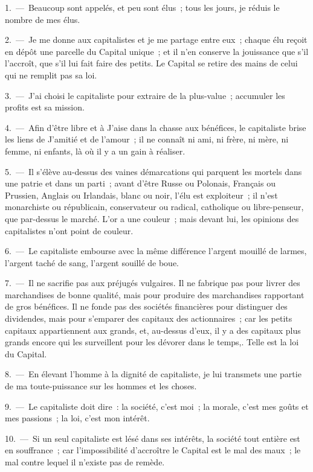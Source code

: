 \documentclass[french,twoside]{book} %
\begin{document}
1. — Beaucoup sont appelés, et peu sont élus ; tous les jours, je réduis le nombre de mes élus.\par
2. — Je me donne aux capitalistes et je me partage entre eux ; chaque élu reçoit en dépôt une parcelle du Capital unique ; et il n’en conserve la jouissance que s’il l’accroît, que s’il lui fait faire des petits. Le Capital se retire des mains de celui qui ne remplit pas sa loi.\par
3. — J'ai choisi le capitaliste pour extraire de la plus-value ; accumuler les profits est sa mission.\par
4. — Afin d’être libre et à J'aise dans la chasse aux bénéfices, le capitaliste brise les liens de J'amitié et de l’amour ; il ne connaît ni ami, ni frère, ni mère, ni femme, ni enfants, là où il y a un gain à réaliser.\par
5. — Il s’élève au-dessus des vaines démarcations qui parquent les mortels dans une patrie et dans un parti ; avant d’être Russe ou Polonais, Français ou Prussien, Anglais ou Irlandais, blanc ou noir, l’élu est exploiteur ; il n’est monarchiste ou républicain, conservateur ou radical, catholique ou libre-penseur, que par-dessus le marché. L'or a une couleur ; mais devant lui, les opinions des capitalistes n’ont point de couleur.\par
6. — Le capitaliste embourse avec la même différence l’argent mouillé de larmes, l’argent taché de sang, l’argent souillé de boue.\par
7. — Il ne sacrifie pas aux préjugés vulgaires. Il ne fabrique pas pour livrer des marchandises de bonne qualité, mais pour produire des marchandises rapportant de gros bénéfices. Il ne fonde pas des sociétés financières pour distinguer des dividendes, mais pour s’emparer des capitaux des actionnaires ; car les petits capitaux appartiennent aux grands, et, au-dessus d’eux, il y a des capitaux plus grands encore qui les surveillent pour les dévorer dans le temps,. Telle est la loi du Capital.\par
8. — En élevant l’homme à la dignité de capitaliste, je lui transmets une partie de ma toute-puissance sur les hommes et les choses.\par
9. — Le capitaliste doit dire : la société, c’est moi ; la morale, c’est mes goûts et mes passions ; la loi, c’est mon intérêt.\par
10. — Si un seul capitaliste est lésé dans ses intérêts, la société tout entière est en souffrance ; car l’impossibilité d’accroître le Capital est le mal des maux ; le mal contre lequel il n’existe pas de remède.\par
\end{document}
